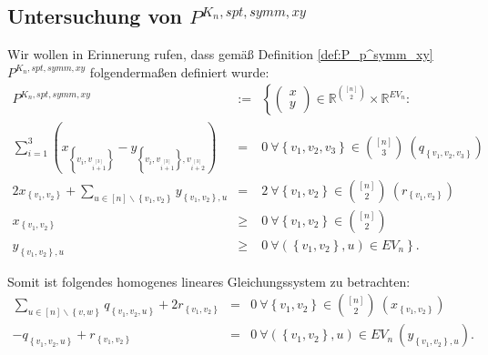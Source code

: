 \documentclass[10p,a4paper,BCOR = 12mm, DIV=15]{scrbook}
\begin{document}
\subsection{Untersuchung von $P^{K_n, spt, symm, xy}$}

Wir wollen in Erinnerung rufen, dass gemäß Definition \ref{def:P_p^symm_xy} $P^{K_n, spt, symm, xy}$ folgendermaßen definiert wurde:
\begin{eqnarray*}
P^{K_n, spt, symm, xy} & := & \left\{ \left(\begin{array}{c}
x \\
y
\end{array}\right)\in\mathbb{R}^{[n]\choose 2}\times \mathbb{R}^{EV_n}: \right.
\nonumber \\
\sum_{i=1}^3 \left(x_{\left\{v_{i}, v_{i \stackrel{\left[3\right]}{+} 1}\right\}} -  y_{\left\{v_{i}, v_{i \stackrel{\left[3\right]}{+} 1}\right\}, v_{i \stackrel{\left[3\right]}{+} 2}}\right) & = & 0\ \forall \left\{v_1, v_2, v_3\right\}\in {[n] \choose 3}\ \left(q_{\left\{v_1, v_2, v_3\right\}}\right) \\
2 x_{\left\{v_1, v_2\right\}} + \sum_{u\in[n]\backslash\left\{v_1, v_2\right\}} y_{\left\{v_1, v_2\right\}, u} & = & 2\ \forall \left\{v_1, v_2\right\}\in {[n] \choose 2}\ \left(r_{\left\{v_1, v_2\right\}}\right) \\
x_{\left\{v_1, v_2\right\}} & \geq & 0 \ \forall \left\{v_1, v_2\right\} \in {\left[n\right] \choose 2} \nonumber \\
y_{\left\{v_1, v_2\right\}, u} & \geq & \left.0 \ \forall \left(\left\{v_1, v_2\right\}, u\right) \in EV_n\right\}. \nonumber
\end{eqnarray*}

Somit ist folgendes homogenes lineares Gleichungssystem zu betrachten:
\begin{eqnarray*}
\sum_{u\in[n]\backslash\left\{v, w\right\}} q_{\left\{v_1, v_2, u\right\}} + 2 r_{\left\{v_1, v_2\right\}} & = & 0 \ \forall \left\{v_1, v_2\right\}\in {[n] \choose 2} \ \left(x_{\left\{v_1, v_2\right\}}\right) \\
-q_{\left\{v_1, v_2, u\right\}} + r_{\left\{v_1, v_2\right\}} & = &  0\ \forall \left(\left\{v_1, v_2\right\}, u\right)\in EV_n  \ \left(y_{\left\{v_1, v_2\right\}, u}\right).
\end{eqnarray*}
\end{document}
